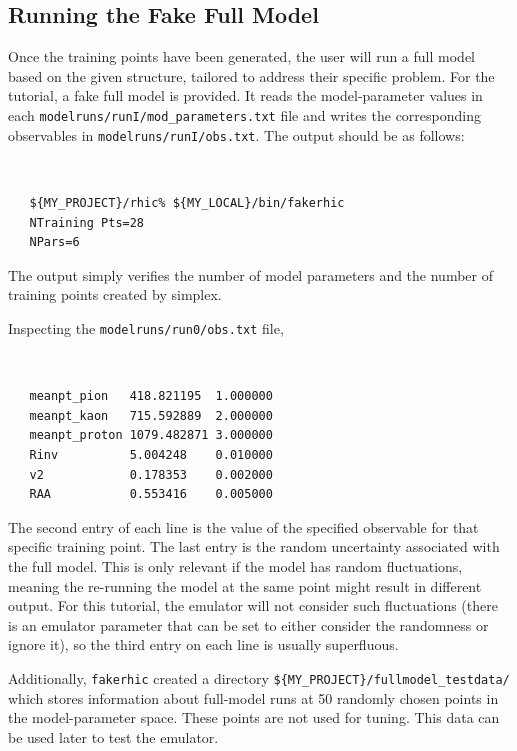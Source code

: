 \documentclass[UserManual.tex]{subfiles}
\begin{document}
\subsection{Running the Fake Full Model}
Once the training points have been generated, the user will run a full model based on the given structure, tailored to address their specific problem. For the tutorial, a fake full model is provided. It reads the model-parameter values in each {\tt modelruns/runI/mod\_parameters.txt} file and writes the corresponding observables in {\tt modelruns/runI/obs.txt}. The output should be as follows:
{\tt
\begin{verbatim}
   ${MY_PROJECT}/rhic% ${MY_LOCAL}/bin/fakerhic
   NTraining Pts=28
   NPars=6
\end{verbatim}
}
The output simply verifies the number of model parameters and the number of training points created by simplex.

Inspecting the {\tt modelruns/run0/obs.txt} file,
{\tt
\begin{verbatim}
   meanpt_pion   418.821195  1.000000
   meanpt_kaon   715.592889  2.000000
   meanpt_proton 1079.482871 3.000000
   Rinv          5.004248    0.010000
   v2            0.178353    0.002000
   RAA           0.553416    0.005000
\end{verbatim}
}
The second entry of each line is the value of the specified observable for that specific training point. The last entry is the random uncertainty associated with the full model. This is only relevant if the model has random fluctuations, meaning the re-running the model at the same point might result in different output. For this tutorial, the emulator will not consider such fluctuations (there is an emulator parameter that can be set to either consider the randomness or ignore it), so the third entry on each line is usually superfluous. 

Additionally, {\tt fakerhic} created a directory {\tt \$\{MY\_PROJECT\}/fullmodel\_testdata/} which stores information about full-model runs at 50 randomly chosen points in the model-parameter space. These points are not used for tuning. This data can be used later to test the emulator. 
\end{document}
